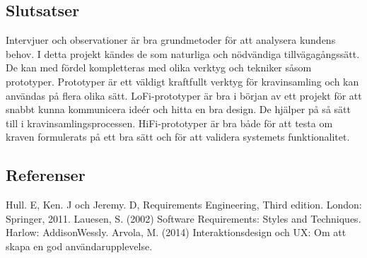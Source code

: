 \subsection{Slutsatser}
Intervjuer och observationer är bra grundmetoder för att analysera kundens behov. I detta projekt kändes de som naturliga och nödvändiga tillvägagångssätt. De kan med fördel kompletteras med olika verktyg och tekniker såsom prototyper. Prototyper är ett väldigt kraftfullt verktyg för kravinsamling och kan användas på flera olika sätt. LoFi-prototyper är bra i början av ett projekt för att snabbt kunna kommunicera ideér och hitta en bra design. De hjälper på så sätt till i kravinsamlingsprocessen. HiFi-prototyper är bra både för att testa om kraven formulerats på ett bra sätt och för att validera systemets funktionalitet.
\subsection{Referenser}

\vspace{-9mm}
\begin{thebibliography}{9}
Hull. E, Ken. J och Jeremy. D, Requirements Engineering, Third edition. London: Springer, 2011.
Lauesen, S. (2002) Software Requirements: Styles and Techniques. Harlow: AddisonWessly.
Arvola, M. (2014) Interaktionsdesign och UX: Om att skapa en god användarupplevelse. %
\end{thebibliography}

